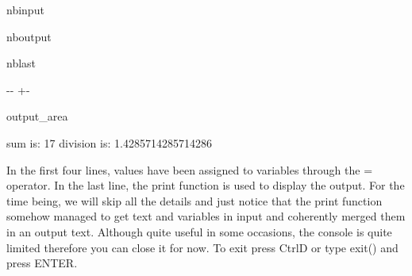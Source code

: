 \documentclass[letterpaper,10pt,english]{sphinxmanual}
\begin{document}
\begin{sphinxuseclass}{nbinput}
{
\begin{sphinxVerbatim}[commandchars=\\\{\}]
\llap{\color{nbsphinxin}[6]:\,\hspace{\fboxrule}\hspace{\fboxsep}}  
  
    
    

 
\end{sphinxVerbatim}
}

\end{sphinxuseclass}
\begin{sphinxuseclass}{nboutput}
\begin{sphinxuseclass}{nblast}
{

\kern-\sphinxverbatimsmallskipamount\kern-\baselineskip
\kern+\FrameHeightAdjust\kern-\fboxrule
\vspace{\nbsphinxcodecellspacing}

\begin{sphinxuseclass}{output_area}
\begin{sphinxuseclass}{}


\begin{sphinxVerbatim}[commandchars=\\\{\}]
sum is: 17  division is: 1.4285714285714286
\end{sphinxVerbatim}



\end{sphinxuseclass}
\end{sphinxuseclass}
}

\end{sphinxuseclass}
\end{sphinxuseclass}
\sphinxAtStartPar
In the first four lines, values have been assigned to variables through the = operator. In the last line, the print function is used to display the output. For the time being, we will skip all the details and just notice that the print function somehow managed to get text and variables in input and coherently merged them in an output text. Although quite useful in some occasions, the console is quite limited therefore you can close it for now. To exit press Ctrl\sphinxhyphen{}D or type exit() and press ENTER.
\end{document}
